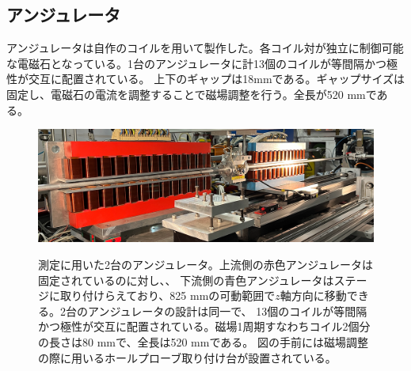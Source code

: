 \documentclass[a4paper,11pt,uplatex]{jsbook}
\begin{document}
\subsection{アンジュレータ}
アンジュレータは自作のコイルを用いて製作した。各コイル対が独立に制御可能な電磁石となっている。1台のアンジュレータに計13個のコイルが等間隔かつ極性が交互に配置されている。
上下のギャップは18mmである。ギャップサイズは固定し、電磁石の電流を調整することで磁場調整を行う。全長が520 mmである。
\begin{figure}[h]
  \centering
  \includegraphics[width=\linewidth]{image/3-undulator.png}\\
  \caption[アンジュレータ]{測定に用いた2台のアンジュレータ。上流側の赤色アンジュレータは固定されているのに対し、、
  下流側の青色アンジュレータはステージに取り付けらえており、825 mmの可動範囲で$z$軸方向に移動できる。2台のアンジュレータの設計は同一で、
  13個のコイルが等間隔かつ極性が交互に配置されている。磁場1周期すなわちコイル2個分の長さは80 mmで、全長は520 mmである。
  図の手前には磁場調整の際に用いるホールプローブ取り付け台が設置されている。} 
  \label{undulator}
\end{figure}
\end{document}
